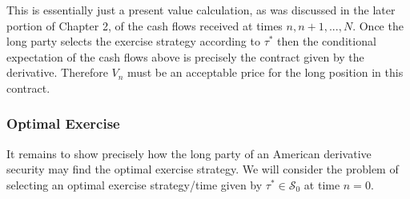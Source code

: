\documentclass[12pt]{article}
\newlength\tindent
\renewcommand{\indent}{\hspace*{\tindent}}
\begin{document}
\indent This is essentially just a present value calculation, as was discussed in the later portion of Chapter 2, of the cash flows received at times $n,n + 1,...,N$. Once the long party selects the exercise strategy according to $\tau^*$ then the conditional expectation of the cash flows above is precisely the contract given by the derivative. Therefore $V_n$ must be an acceptable price for the long position in this contract.

\subsubsection{Optimal Exercise}

\indent It remains to show precisely how the long party of an American derivative security may find the optimal exercise strategy. We will consider the problem of selecting an optimal exercise strategy/time given by $\tau^* \in \mathcal S_0$ at time $n = 0$.
\end{document}
